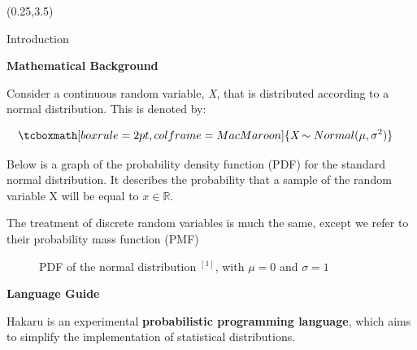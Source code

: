 \documentclass[22pt]{beamer}
\begin{document}
\begin{frame}[fragile]
\begin{textblock}{5}(0.25,3.5)


\begin{block}{\Large{Introduction}}
\justifying

\bigskip
\normalsize{\textbf{Mathematical Background}}

\bigskip
\scriptsize{Consider a continuous random variable, \textit{X}, that is distributed according to a normal distribution. This is denoted by: }

\begin{equation*}
\begin{aligned}
& \tcboxmath[boxrule=2pt,colframe=MacMaroon]{\textit{X} \sim Normal(\mu, \sigma^2)}
\end{aligned}
\end{equation*}

\bigskip
\scriptsize{Below is a graph of the probability density function (PDF) for the standard normal distribution. It describes the probability that a sample of the random variable X will be equal to $x \in \mathbb{R}$.}

\bigskip
\scriptsize{The treatment of discrete random variables is much the same, except we refer to their probability mass function (PMF)}

\begin{figure}
\caption{\tiny{PDF of the normal distribution $^{[1]}$, with $\mu = 0$ and $\sigma = 1$}}
\end{figure}

\normalsize{\textbf{Language Guide}}

\bigskip
\scriptsize{Hakaru is an experimental \textbf{probabilistic programming language}, which aims to simplify the implementation of statistical distributions. 

}
\end{block}
\end{textblock}
\end{frame}
\end{document}
